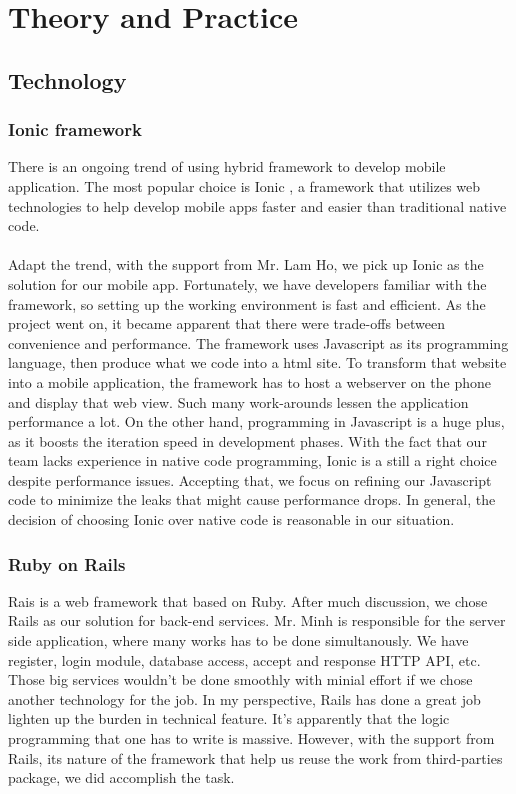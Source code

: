 \chapter{Theory and Practice}

\section{Technology}
\subsection{Ionic framework}
There is an ongoing trend of using hybrid framework to develop mobile application. The most popular choice is Ionic \cite{ionic}, a framework that utilizes web technologies to help develop mobile apps faster and easier than traditional native code.
\\
\\
Adapt the trend, with the support from Mr. Lam Ho, we pick up Ionic as the solution for our mobile app. Fortunately, we have developers familiar with the framework, so setting up the working environment is fast and efficient. As the project went on, it became apparent that there were trade-offs between convenience and performance. The framework uses Javascript as its programming language, then produce what we code into a html site. To transform that website into a mobile application, the framework has to  host a webserver on the phone and display that web view. Such many work-arounds lessen the application performance a lot. On the other hand, programming in Javascript is a huge plus, as it boosts the iteration speed in development phases. With the fact that our team lacks experience in native code programming, Ionic is a still a right choice despite performance issues. Accepting that, we focus on refining our Javascript code to minimize the leaks that might cause performance drops. In general, the decision of choosing Ionic over native code is reasonable in our situation.
\subsection{Ruby on Rails}
Rais \cite{rails} is a web framework that based on Ruby. After much discussion, we chose Rails as our solution for back-end services.
Mr. Minh is responsible for the server side application, where many works has to be done simultanously. We have register, login module, database access, accept and response HTTP API, etc. Those big services wouldn't be done smoothly with minial effort if we chose another technology for the job. In my perspective, Rails has done a great job lighten up the burden in technical feature. It's apparently that the logic programming that one has to write is massive. However, with the support from Rails, its nature of the framework that help us reuse the work from third-parties package, we did accomplish the task.
